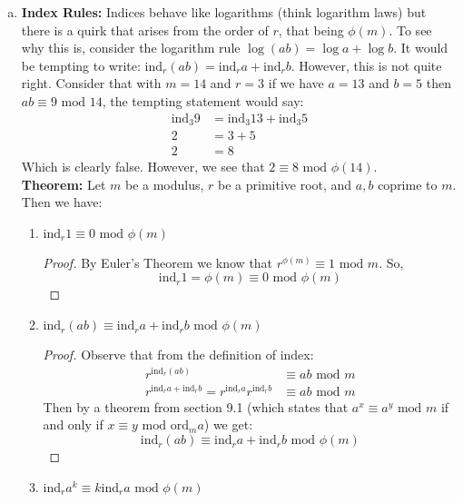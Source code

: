\documentclass[class=article, crop=false]{standalone}
\begin{document}
\begin{enumerate}[1.]
\begin{enumerate}[(a)]
	\item \textbf{Index Rules:} Indices behave like logarithms (think logarithm laws)
	but there is a quirk that arises from the order of $r$, that being $\phi(m)$. To
	see why this is, consider the logarithm rule $\log(ab) = \log a + \log b$.
	It would be tempting to write: $\mbox{ind}_r (ab) = \mbox{ind}_r a + \mbox{ind}_r b$.
	However, this is not quite right. Consider that with $m=14$ and $r=3$ if we have
	$a=13$ and $b=5$ then $ab \equiv 9\mbox{ mod }14$, the tempting statement would say:
	\begin{align*}
		\mbox{ind}_3 9 &= \mbox{ind}_3 13 + \mbox{ind}_3 5 \\
		2 &= 3+5 \\
		2 &= 8
	\end{align*}
	Which is clearly false. However, we see that $2\equiv 8\mbox{ mod }\phi(14)$. \\
	\textbf{Theorem:} Let $m$ be a modulus, $r$ be a primitive root, and $a,b$ coprime to $m$.
	Then we have:
	\begin{enumerate}
		\item $\mbox{ind}_r 1 \equiv 0\mbox{ mod }\phi(m)$
		\begin{proof}
			By Euler's Theorem we know that $r^{\phi(m)}\equiv 1\mbox{ mod }m$. So,
			$$\mbox{ind}_r 1 = \phi(m) \equiv 0\mbox{ mod }\phi(m)$$
		\end{proof}
		\item $\mbox{ind}_r (ab) \equiv \mbox{ind}_r a + \mbox{ind}_r b \mbox{ mod }\phi(m)$
		\begin{proof}
			Observe that from the definition of index:
			\begin{align*}
				r^{\mbox{ind}_r (ab)} &\equiv ab\mbox{ mod }m \\
				r^{\mbox{ind}_r a + \mbox{ind}_r b} = r^{\mbox{ind}_r a} r^{\mbox{ind}_r b} &\equiv ab\mbox{ mod }m
			\end{align*}
			Then by a theorem from section 9.1 (which states that 
			$a^x \equiv a^y \mbox{ mod }m$ if and only if $x\equiv y\mbox{ mod }\mbox{ord}_m a$)
			we get:
			$$\mbox{ind}_r (ab) \equiv \mbox{ind}_r a + \mbox{ind}_r b \mbox{ mod }\phi(m)$$
		\end{proof}
		\item $\mbox{ind}_r a^k \equiv k\mbox{ind}_r a \mbox{ mod }\phi(m)$
	\end{enumerate}
\end{enumerate}

\end{enumerate}
\end{document}

